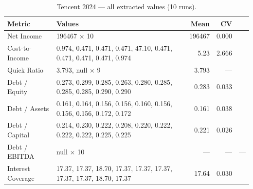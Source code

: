 \documentclass[12pt, a4paper]{article}
\newcommand{\cmark}{\textcolor{green!60!black}{\ding{51}}}  %
\newcommand{\xmark}{\textcolor{red!70!black}{\ding{55}}}    %
\newcommand{\nmark}{\textcolor{gray}{---}}                   %
\begin{document}
\begin{table}[H]
\centering\small
\caption{Tencent 2024 --- all extracted values (10 runs).}
\label{tab:ten-raw}
\begin{tabular}{lp{8.5cm}rrc}
\toprule
\textbf{Metric} & \textbf{Values} & \textbf{Mean} & \textbf{CV} & \\
\midrule
Net Income         & 196467 $\times$ 10                                                & 196467 & 0.000 & \cmark \\
Cost-to-Income     & 0.974, 0.471, 0.471, 0.471, 47.10, 0.471, 0.471, 0.471, 0.471, 0.974 & 5.23 & 2.666 & \xmark \\
Quick Ratio        & 3.793, null $\times$ 9                                            &  3.793 &  ---  & \xmark \\
Debt / Equity      & 0.273, 0.299, 0.285, 0.263, 0.280, 0.285, 0.285, 0.285, 0.290, 0.290 & 0.283 & 0.033 & \cmark \\
Debt / Assets      & 0.161, 0.164, 0.156, 0.156, 0.160, 0.156, 0.156, 0.156, 0.172, 0.172 & 0.161 & 0.038 & \cmark \\
Debt / Capital     & 0.214, 0.230, 0.222, 0.208, 0.220, 0.222, 0.222, 0.222, 0.225, 0.225 & 0.221 & 0.026 & \cmark \\
Debt / EBITDA      & null $\times$ 10                                                  &  ---   &  ---  & \nmark \\
Interest Coverage  & 17.37, 17.37, 18.70, 17.37, 17.37, 17.37, 17.37, 17.37, 18.70, 17.37  & 17.64 & 0.030 & \cmark \\
\bottomrule
\end{tabular}
\end{table}
\end{document}
